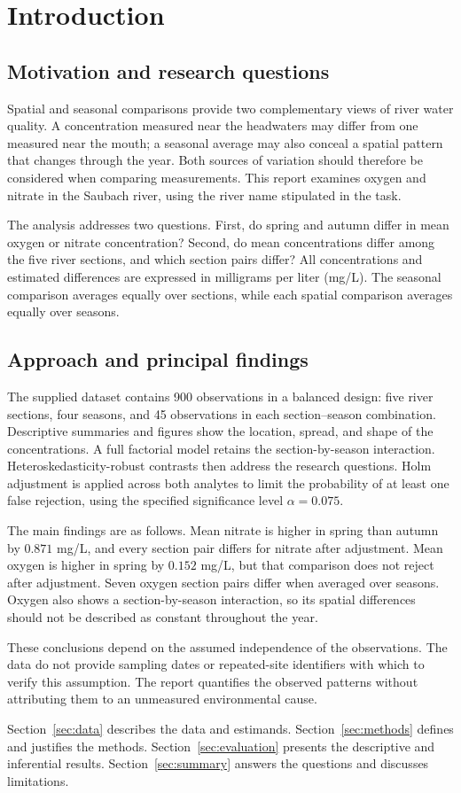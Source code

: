 \section{Introduction}
\subsection{Motivation and research questions}
Spatial and seasonal comparisons provide two complementary views of river water quality. A concentration measured near the headwaters may differ from one measured near the mouth; a seasonal average may also conceal a spatial pattern that changes through the year. Both sources of variation should therefore be considered when comparing measurements. This report examines oxygen and nitrate in the Saubach river, using the river name stipulated in the task.

The analysis addresses two questions. First, do spring and autumn differ in mean oxygen or nitrate concentration? Second, do mean concentrations differ among the five river sections, and which section pairs differ? All concentrations and estimated differences are expressed in milligrams per liter (mg/L). The seasonal comparison averages equally over sections, while each spatial comparison averages equally over seasons.

\subsection{Approach and principal findings}
The supplied dataset contains 900 observations in a balanced design: five river sections, four seasons, and 45 observations in each section--season combination. Descriptive summaries and figures show the location, spread, and shape of the concentrations. A full factorial model retains the section-by-season interaction. Heteroskedasticity-robust contrasts then address the research questions. Holm adjustment is applied across both analytes to limit the probability of at least one false rejection, using the specified significance level $\alpha=0.075$.

The main findings are as follows. Mean nitrate is higher in spring than autumn by $0.871$ mg/L, and every section pair differs for nitrate after adjustment. Mean oxygen is higher in spring by $0.152$ mg/L, but that comparison does not reject after adjustment. Seven oxygen section pairs differ when averaged over seasons. Oxygen also shows a section-by-season interaction, so its spatial differences should not be described as constant throughout the year.

These conclusions depend on the assumed independence of the observations. The data do not provide sampling dates or repeated-site identifiers with which to verify this assumption. The report quantifies the observed patterns without attributing them to an unmeasured environmental cause.

Section~\ref{sec:data} describes the data and estimands. Section~\ref{sec:methods} defines and justifies the methods. Section~\ref{sec:evaluation} presents the descriptive and inferential results. Section~\ref{sec:summary} answers the questions and discusses limitations.
